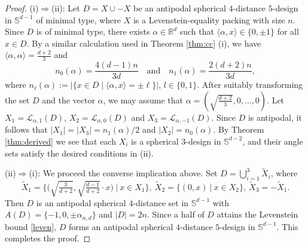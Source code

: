 \documentclass[11pt]{article}
\theoremstyle{definition}
\theoremstyle{remark}
\begin{document}
\begin{proof}
(i)$\Rightarrow$(ii):
Let $D=X\cup -X$ be an antipodal spherical $4$-distance $5$-design in $\mathbb{S}^{d-1}$ of minimal type, where $X$ is a Levenstein-equality packing with size $n$. 
Since $D$ is of minimal type, there exists  $ \alpha\in \mathbb{R}^d$ such that $\langle  \alpha, x\rangle\in \{0,\pm1\}$ for all $x\in D$.
By a similar calculation used in Theorem \ref{thm:cc} (i), we have $\langle \alpha,\alpha\rangle=\frac{d+2}{3}$ and
\begin{equation*}
n_0( \alpha)=\frac{4(d-1)n}{3d}\quad\text{and}\quad n_1( \alpha)=\frac{2(d+2)n}{3d}, 
\end{equation*}
where $n_\ell(\alpha):=|\{x\in D \mid \langle \alpha,x\rangle=\pm \ell\}|$, $l\in\{0,1\}$.
After suitably transforming the set $D$ and the vector $\alpha$, we may assume that $\alpha=(\sqrt{\frac{d+2}{3}},0,\ldots,0)$.
Let $X_1=\mathcal{L}_{\alpha,1}(D)$, $X_2=\mathcal{L}_{\alpha,0}(D)$ and $X_3=\mathcal{L}_{\alpha,-1}(D)$.
Since $D$ is antipodal, it follows that $|X_1|=|X_3|=n_1( \alpha)/2$ and $|X_2|= n_0( \alpha)$. By Theorem \ref{thm:derived} we see that each $X_i$ is a spherical $3$-design in $\mathbb{S}^{d-2}$, and their angle sets satisfy the desired conditions in (ii). 


(ii)$\Rightarrow$(i): We proceed the converse implication above. 
Set $D=\bigcup_{i=1}^3 \widetilde{X}_i$, where 
\begin{equation*}
\widetilde{X}_1=\bigg\{\Big(\sqrt{\tfrac{3}{d+2}},\sqrt{\tfrac{d-1}{d+2}}\cdot x\Big) \ \Big|\  x\in X_1\bigg\},\  \widetilde{X}_2=\bigg\{(0,x) \ \Big|\  x\in X_2\bigg\},\ \widetilde{X}_3=-\widetilde{X}_1.
\end{equation*}
Then $D$ is an antipodal spherical $4$-distance set in $\mathbb{S}^{d-1}$ with $A(D)=\{-1,0,\pm\alpha_{n,d}\}$ and $|D|=2n$. Since a half of $D$ attains the Levenstein bound \eqref{leven}, $D$ forms an antipodal spherical $4$-distance $5$-design in $\mathbb{S}^{d-1}$. 
This completes the proof.
\end{proof}
\end{document}
